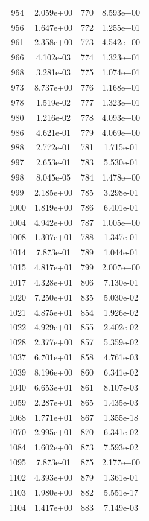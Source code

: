 \documentclass[12pt]{article}
\begin{document}
\begin{longtable}{@{}cccc@{}}
954 & 2.059e+00 & 770 & 8.593e+00 \\
956 & 1.647e+00 & 772 & 1.255e+01 \\
961 & 2.358e+00 & 773 & 4.542e+00 \\
966 & 4.102e-03 & 774 & 1.323e+01 \\
968 & 3.281e-03 & 775 & 1.074e+01 \\
973 & 8.737e+00 & 776 & 1.168e+01 \\
978 & 1.519e-02 & 777 & 1.323e+01 \\
980 & 1.216e-02 & 778 & 4.093e+00 \\
986 & 4.621e-01 & 779 & 4.069e+00 \\
988 & 2.772e-01 & 781 & 1.715e-01 \\
997 & 2.653e-01 & 783 & 5.530e-01 \\
998 & 8.045e-05 & 784 & 1.478e+00 \\
999 & 2.185e+00 & 785 & 3.298e-01 \\
1000 & 1.819e+00 & 786 & 6.401e-01 \\
1004 & 4.942e+00 & 787 & 1.005e+00 \\
1008 & 1.307e+01 & 788 & 1.347e-01 \\
1014 & 7.873e-01 & 789 & 1.044e-01 \\
1015 & 4.817e+01 & 799 & 2.007e+00 \\
1017 & 4.328e+01 & 806 & 7.130e-01 \\
1020 & 7.250e+01 & 835 & 5.030e-02 \\
1021 & 4.875e+01 & 854 & 1.926e-02 \\
1022 & 4.929e+01 & 855 & 2.402e-02 \\
1028 & 2.377e+00 & 857 & 5.359e-02 \\
1037 & 6.701e+01 & 858 & 4.761e-03 \\
1039 & 8.196e+00 & 860 & 6.341e-02 \\
1040 & 6.653e+01 & 861 & 8.107e-03 \\
1059 & 2.287e+01 & 865 & 1.435e-03 \\
1068 & 1.771e+01 & 867 & 1.355e-18 \\
1070 & 2.995e+01 & 870 & 6.341e-02 \\
1084 & 1.602e+00 & 873 & 7.593e-02 \\
1095 & 7.873e-01 & 875 & 2.177e+00 \\
1102 & 4.393e+00 & 879 & 1.361e-01 \\
1103 & 1.980e+00 & 882 & 5.551e-17 \\
1104 & 1.417e+00 & 883 & 7.149e-03 \\

\end{longtable}
\end{document}
